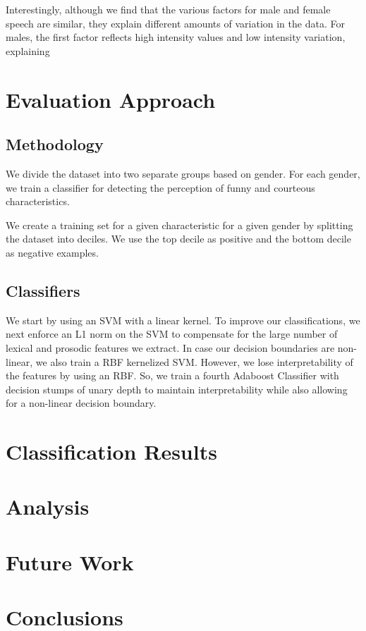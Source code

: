 \documentclass[a4paper]{article}
\begin{document}
Interestingly, although we find that the various factors for male and female speech are similar, they explain different amounts of variation in the data.  For males, the first factor reflects high intensity values and low intensity variation, explaining   

\section{Evaluation Approach}

\subsection{Methodology}
We divide the dataset into two separate groups based on gender. For each gender, we train a classifier for detecting the perception of funny and courteous characteristics.  

We create a training set for a given characteristic for a given gender by splitting the dataset into deciles. We use the top decile as positive and the bottom decile as negative examples. 

\subsection{Classifiers}
We start by using an SVM with a linear kernel. To improve our classifications, we next enforce an L1 norm on the SVM to compensate for the large number of lexical and prosodic features we extract. In case our decision boundaries are non-linear, we also train a RBF kernelized SVM. However, we lose interpretability of the features by using an RBF. So, we train a fourth Adaboost Classifier with decision stumps of unary depth to maintain interpretability while also allowing for a non-linear decision boundary.  

\section{Classification Results}

\section{Analysis}


\section{Future Work}


\section{Conclusions}
\end{document}
